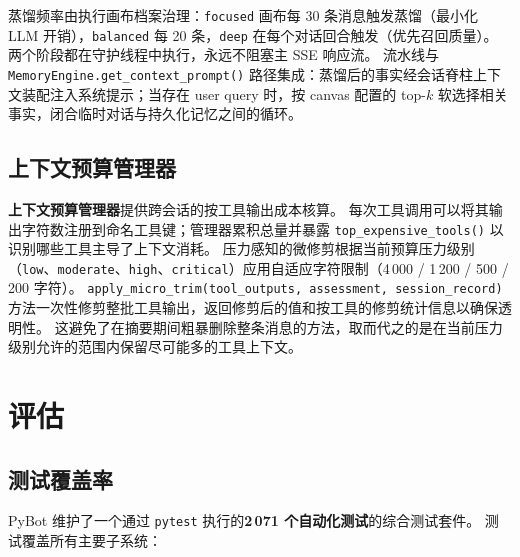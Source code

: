 \documentclass[11pt,a4paper]{article}
\begin{document}
蒸馏频率由执行画布档案治理：\texttt{focused} 画布每 30 条消息触发蒸馏（最小化 LLM 开销），\texttt{balanced} 每 20 条，\texttt{deep} 在每个对话回合触发（优先召回质量）。
两个阶段都在守护线程中执行，永远不阻塞主 SSE 响应流。
流水线与 \texttt{MemoryEngine.get\_context\_prompt()} 路径集成：蒸馏后的事实经会话脊柱上下文装配注入系统提示；当存在 user query 时，按 canvas 配置的 top-$k$ 软选择相关事实，闭合临时对话与持久化记忆之间的循环。

\subsection{上下文预算管理器}
\textbf{上下文预算管理器}提供跨会话的按工具输出成本核算。
每次工具调用可以将其输出字符数注册到命名工具键；管理器累积总量并暴露 \texttt{top\_expensive\_tools()} 以识别哪些工具主导了上下文消耗。
压力感知的微修剪根据当前预算压力级别（\texttt{low}、\texttt{moderate}、\texttt{high}、\texttt{critical}）应用自适应字符限制（4\,000 / 1\,200 / 500 / 200 字符）。
\texttt{apply\_micro\_trim(tool\_outputs, assessment, session\_record)} 方法一次性修剪整批工具输出，返回修剪后的值和按工具的修剪统计信息以确保透明性。
这避免了在摘要期间粗暴删除整条消息的方法，取而代之的是在当前压力级别允许的范围内保留尽可能多的工具上下文。

\section{评估}
\label{sec:eval}

\subsection{测试覆盖率}

PyBot 维护了一个通过 \texttt{pytest} 执行的\textbf{2\,071 个自动化测试}的综合测试套件。
测试覆盖所有主要子系统：
\end{document}
